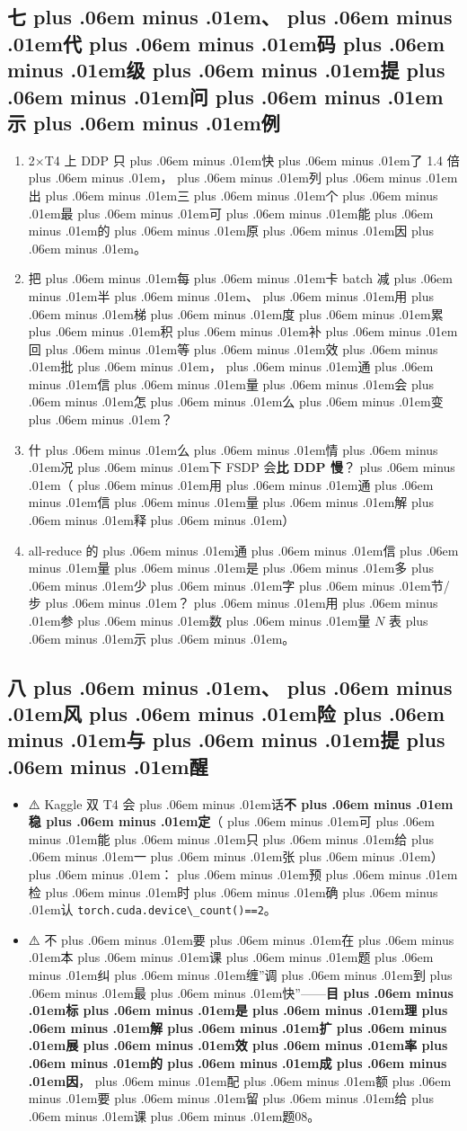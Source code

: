 \documentclass[
]{article}
\newcommand{\passthrough}[1]{#1}
\providecommand{\tightlist}{%
  \setlength{\itemsep}{0pt}\setlength{\parskip}{0pt}}
\def\zh#1{{\zhfont #1}}
\def\sym#1{{\symfont #1}}
\def\zhglue{\hskip0pt plus .06em minus .01em}
\begin{document}
\subsection{\zh{七\zhglue 、\zhglue 代\zhglue 码\zhglue 级\zhglue 提\zhglue 问\zhglue 示\zhglue 例}}\label{ux4e03ux4ee3ux7801ux7ea7ux63d0ux95eeux793aux4f8b-3}

\begin{enumerate}
\def\labelenumi{\arabic{enumi}.}
\tightlist
\item
  2\sym{×}T4 \zh{上} DDP \zh{只\zhglue 快\zhglue 了} 1.4 \zh{倍\zhglue ，\zhglue 列\zhglue 出\zhglue 三\zhglue 个\zhglue 最\zhglue 可\zhglue 能\zhglue 的\zhglue 原\zhglue 因\zhglue 。}
\item
  \zh{把\zhglue 每\zhglue 卡} batch \zh{减\zhglue 半\zhglue 、\zhglue 用\zhglue 梯\zhglue 度\zhglue 累\zhglue 积\zhglue 补\zhglue 回\zhglue 等\zhglue 效\zhglue 批\zhglue ，\zhglue 通\zhglue 信\zhglue 量\zhglue 会\zhglue 怎\zhglue 么\zhglue 变\zhglue ？}
\item
  \zh{什\zhglue 么\zhglue 情\zhglue 况\zhglue 下} FSDP \zh{会}\textbf{\zh{比} DDP \zh{慢}}\zh{？\zhglue （\zhglue 用\zhglue 通\zhglue 信\zhglue 量\zhglue 解\zhglue 释\zhglue ）}
\item
  all-reduce \zh{的\zhglue 通\zhglue 信\zhglue 量\zhglue 是\zhglue 多\zhglue 少\zhglue 字\zhglue 节}/\zh{步\zhglue ？\zhglue 用\zhglue 参\zhglue 数\zhglue 量} \(N\) \zh{表\zhglue 示\zhglue 。}
\end{enumerate}

\subsection{\zh{八\zhglue 、\zhglue 风\zhglue 险\zhglue 与\zhglue 提\zhglue 醒}}\label{ux516bux98ceux9669ux4e0eux63d0ux9192-4}

\begin{itemize}
\tightlist
\item
  \sym{⚠️} Kaggle \zh{双} T4 \zh{会\zhglue 话}\textbf{\zh{不\zhglue 稳\zhglue 定}}\zh{（\zhglue 可\zhglue 能\zhglue 只\zhglue 给\zhglue 一\zhglue 张\zhglue ）\zhglue ：\zhglue 预\zhglue 检\zhglue 时\zhglue 确\zhglue 认} \passthrough{\lstinline!torch.cuda.device\_count()==2!}\zh{。}
\item
  \sym{⚠️} \zh{不\zhglue 要\zhglue 在\zhglue 本\zhglue 课\zhglue 题\zhglue 纠\zhglue 缠}''\zh{调\zhglue 到\zhglue 最\zhglue 快}''------\textbf{\zh{目\zhglue 标\zhglue 是\zhglue 理\zhglue 解\zhglue 扩\zhglue 展\zhglue 效\zhglue 率\zhglue 的\zhglue 成\zhglue 因}}\zh{，\zhglue 配\zhglue 额\zhglue 要\zhglue 留\zhglue 给\zhglue 课\zhglue 题}08\zh{。}
\end{itemize}
\end{document}
